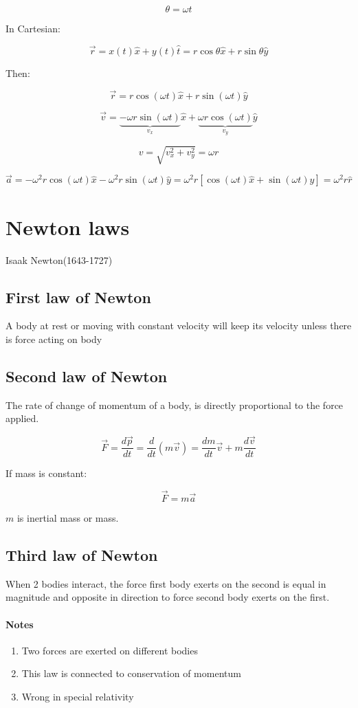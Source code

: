 $$\theta = \omega t$$

In Cartesian:

$$\vec{r} = x(t) \hat{x} + y(t) \hat{t} = r\cos\theta \hat{x} + r\sin\theta\hat{y}$$

Then:

$$\vec{r} = r \cos\left( \omega t\right) \hat{x} + r \sin \left( \omega t \right) \hat{y} $$

$$\vec{v} = \underbrace{- \omega r \sin \left( \omega t \right)}_{v_x} \hat{x} + \underbrace{\omega r \cos \left( \omega t \right)}_{v_y} \hat{y} $$

$$ v = \sqrt{v_x^2 + v_y^2} = \omega r $$

$$\vec{a} = - \omega^2r \cos \left( \omega t \right) \hat{x}  - \omega^2 r \sin \left( \omega t \right) \hat{y} = \omega^2 r \left[ \cos \left( \omega t \right) \hat{x} + \sin \left( \omega t \right) \hat{y} \right] = \omega^2 r \hat{r}$$


\section{Newton laws}
Isaak Newton(1643-1727)
\subsection{First law of Newton}
A body at rest or moving with constant velocity will keep its velocity unless there is force acting on body
\subsection{Second law of Newton}
The rate of change of momentum of a body, is directly proportional to the force applied.

$$\vec{F} = \frac{d\vec{p}}{dt} = \frac{d}{dt}\left(m\vec{v}\right) = \frac{dm}{dt}\vec{v} + m\frac{d\vec{v}}{dt}$$ 

If mass is constant:

$$\vec{F} = m\vec{a}$$

$m$ is inertial mass or mass.
\subsection{Third law of Newton}
When 2 bodies interact, the force first body exerts  on the second is equal in magnitude and opposite in direction to force second body exerts on the first.
\paragraph{Notes}
\begin{enumerate}
	\item Two forces are exerted on different bodies
	\item This law is connected to conservation of momentum
	\item Wrong in special relativity
\end{enumerate}


